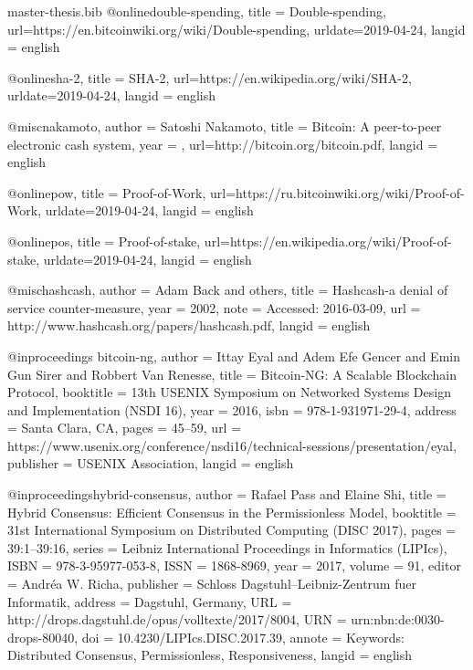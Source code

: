 \begin{filecontents}{master-thesis.bib}
@online{double-spending,
  title = {Double-spending},
  url={https://en.bitcoinwiki.org/wiki/Double-spending},
  urldate={2019-04-24},
  langid = {english}
}

@online{sha-2,
  title = {SHA-2},
  url={https://en.wikipedia.org/wiki/SHA-2},
  urldate={2019-04-24},
  langid = {english}
}

@misc{nakamoto,
    author = {Satoshi Nakamoto},
    title = {Bitcoin: A peer-to-peer electronic cash system},
    year = {},
    url={http://bitcoin.org/bitcoin.pdf},
    langid = {english}
}

@online{pow,
  title = {Proof-of-Work},
  url={https://ru.bitcoinwiki.org/wiki/Proof-of-Work},
  urldate={2019-04-24},
  langid = {english}
}

@online{pos,
  title = {Proof-of-stake},
  url={https://en.wikipedia.org/wiki/Proof-of-stake},
  urldate={2019-04-24},
  langid = {english}
}

@misc{hashcash,
  author = {Adam Back and others},
  title = {Hashcash-a denial of service counter-measure},
  year = {2002},
  note = {Accessed: 2016-03-09},
  url = {http://www.hashcash.org/papers/hashcash.pdf},
  langid = {english}
}

@inproceedings {bitcoin-ng,
  author = {Ittay Eyal and Adem Efe Gencer and Emin Gun Sirer and Robbert Van Renesse},
  title = {Bitcoin-NG: A Scalable Blockchain Protocol},
  booktitle = {13th {USENIX} Symposium on Networked Systems Design and Implementation ({NSDI} 16)},
  year = {2016},
  isbn = {978-1-931971-29-4},
  address = {Santa Clara, CA},
  pages = {45--59},
  url = {https://www.usenix.org/conference/nsdi16/technical-sessions/presentation/eyal},
  publisher = {{USENIX} Association},
  langid = {english}
}

@inproceedings{hybrid-consensus,
  author =	{Rafael Pass and Elaine Shi},
  title =	{{Hybrid Consensus: Efficient Consensus in the Permissionless Model}},
  booktitle =	{31st International Symposium on Distributed Computing (DISC 2017)},
  pages =	{39:1--39:16},
  series =	{Leibniz International Proceedings in Informatics (LIPIcs)},
  ISBN =	{978-3-95977-053-8},
  ISSN =	{1868-8969},
  year =	{2017},
  volume =	{91},
  editor =	{Andr{\'e}a W. Richa},
  publisher =	{Schloss Dagstuhl--Leibniz-Zentrum fuer Informatik},
  address =	{Dagstuhl, Germany},
  URL =		{http://drops.dagstuhl.de/opus/volltexte/2017/8004},
  URN =		{urn:nbn:de:0030-drops-80040},
  doi =		{10.4230/LIPIcs.DISC.2017.39},
  annote =	{Keywords: Distributed Consensus, Permissionless, Responsiveness},
  langid = {english}
}


\end{filecontents}
